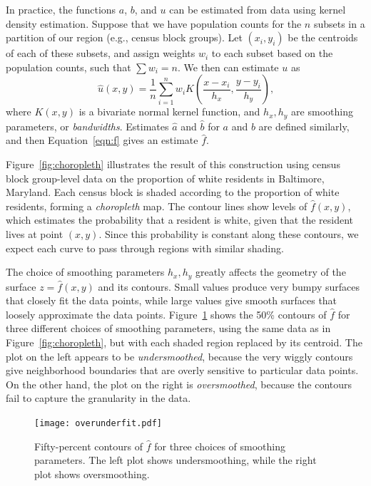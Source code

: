 \documentclass{article}
\theoremstyle{theorem}
\theoremstyle{definition}
\begin{document}
In practice, the functions $a$, $b$, and $u$ can be estimated from data using kernel density estimation. Suppose that we have population counts for the $n$ subsets in a partition of our region (e.g., census block groups). Let $(x_i, y_i)$ be the centroids of each of these subsets, and assign weights $w_i$ to each subset based on the population counts, such that $\sum w_i = n$. We then can estimate $u$ as
$$
\hat{u}(x,y) = \frac{1}{n} \sum_{i=1}^n w_i K\left(\frac{x-x_i}{h_x}, \frac{y-y_i}{h_y} \right)\text{,}
$$
where $K(x,y)$ is a bivariate normal kernel function, and $h_x, h_y$ are smoothing parameters, or \textit{bandwidths}. Estimates $\hat{a}$ and $\hat{b}$ for $a$ and $b$ are defined similarly, and then Equation~\ref{eqn:f} gives an estimate $\hat{f}$.

Figure~\ref{fig:choropleth} illustrates the result of this construction using census block group-level data on the proportion of white residents in Baltimore, Maryland. Each census block is shaded according to the proportion of white residents, forming a \textit{choropleth} map. The contour lines show levels of $\hat{f}(x,y)$, which estimates the probability that a resident is white, given that the resident lives at point $(x,y)$. Since this probability is constant along these contours, we expect each curve to pass through regions with similar shading.

The choice of smoothing parameters $h_x, h_y$ greatly affects the geometry of the surface $z = \hat{f}(x,y)$ and its contours. Small values produce very bumpy surfaces that closely fit the data points, while large values give smooth surfaces that loosely approximate the data points. Figure~\ref{fig:overunderfit} shows the 50\% contours of $\hat{f}$ for three different choices of smoothing parameters, using the same data as in Figure~\ref{fig:choropleth}, but with each shaded region replaced by its centroid. The plot on the left appears to be \textit{undersmoothed}, because the very wiggly contours give neighborhood boundaries that are overly sensitive to particular data points. On the other hand, the plot on the right is \textit{oversmoothed}, because the contours fail to capture the granularity in the data.

\begin{figure}[t!]
  \texttt{[image: overunderfit.pdf]}
  \caption{Fifty-percent contours of $\hat{f}$ for three choices of smoothing parameters. The left plot shows undersmoothing, while the right plot shows oversmoothing.}
  \label{fig:overunderfit}
\end{figure}
\end{document}
